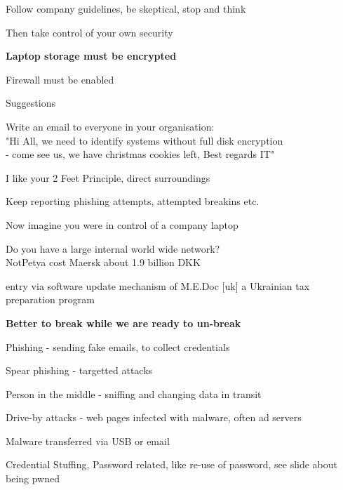 \documentclass[Screen16to9,17pt,footrule]{foils}
\begin{document}
\begin{list1}
\item Follow company guidelines, be skeptical, stop and think
\item Then take control of your own security
\item {\bf Laptop storage must be encrypted}
\item Firewall must be enabled
\item Suggestions
\begin{list2}
\item Write an email to everyone in your organisation:\\
"Hi All, we need to identify systems without full disk encryption \\
- come see us, we have christmas cookies left, Best regards IT"
\end{list2}
\vskip 5mm
\item I like your 2 Feet Principle, direct surroundings
\item Keep reporting phishing attempts, attempted breakins etc.
\end{list1}




\begin{list2}
\item Now imagine you were in control of a company laptop
\item Do you have a large internal world wide network?\\
NotPetya cost Maersk about 1.9 billion DKK

\item entry via software update mechanism of M.E.Doc [uk]  a Ukrainian tax preparation program
\end{list2}

\centerline{\bf Better to break while we are ready to un-break}


\begin{list2}
\item Phishing - sending fake emails, to collect credentials
\item Spear phishing - targetted attacks
\item Person in the middle - sniffing and changing data in transit
\item Drive-by attacks - web pages infected with malware, often ad servers
\item Malware transferred via USB or email
\item Credential Stuffing, Password related, like re-use of password, see slide about being pwned
\end{list2}
\end{document}
